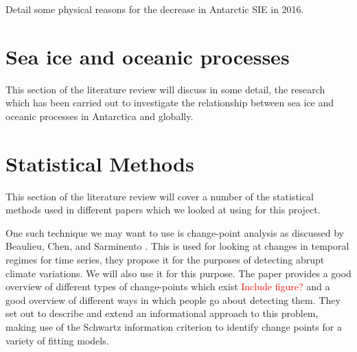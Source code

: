 \documentclass[../main.tex]{subfiles}
\begin{document}
\cite{Turner2020a} Detail some physical reasons for the decrease in Antarctic SIE in 2016.


\section{Sea ice and oceanic processes}
This section of the literature review will discuss in some detail, the research which has been carried out to investigate the relationship between sea ice and oceanic processes in Antarctica and globally.

\section{Statistical Methods}
This section of the literature review will cover a number of the statistical methods used in different papers which we looked at using for this project. 
\medskip

One such technique we may want to use is change-point analysis as discussed by Beaulieu, Chen, and Sarminento \cite{Beaulieu2012}.
This is used for looking at changes in temporal regimes for time series, they propose it for the purposes of detecting abrupt climate variations. We will also use it for this purpose. The paper provides a good overview of different types of change-points which exist  \textcolor{red}{Include figure?} and a good overview of different ways in which people go about detecting them. They set out to describe and extend an informational approach to this problem, making use of the Schwartz information criterion to identify change points for a variety of fitting models.
\end{document}
